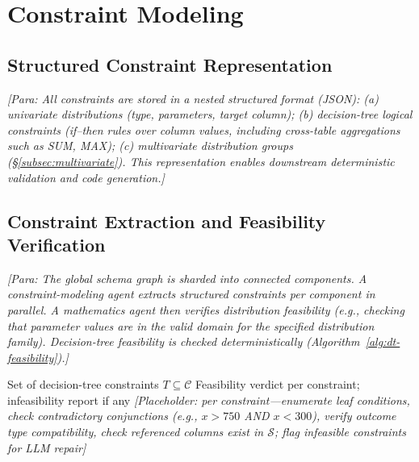 \section{Constraint Modeling}
\label{sec:stage3}

\subsection{Structured Constraint Representation}
\textit{[Para: All constraints are stored in a nested structured format (JSON):
(a) univariate distributions (type, parameters, target column);
(b) decision-tree logical constraints (if--then rules over column values, including
cross-table aggregations such as SUM, MAX);
(c) multivariate distribution groups (\S\ref{subsec:multivariate}).
This representation enables downstream deterministic validation and code generation.]}

\subsection{Constraint Extraction and Feasibility Verification}
\textit{[Para: The global schema graph is sharded into connected components.
A constraint-modeling agent extracts structured constraints per component in parallel.
A mathematics agent then verifies distribution feasibility (e.g., checking that parameter
values are in the valid domain for the specified distribution family).
Decision-tree feasibility is checked deterministically (Algorithm~\ref{alg:dt-feasibility}).]}

\begin{algorithm}[t]
\caption{Deterministic Decision-Tree Feasibility Check}
\label{alg:dt-feasibility}
\begin{algorithmic}[1]
  \Require Set of decision-tree constraints $T \subseteq \mathcal{C}$
  \Ensure Feasibility verdict per constraint; infeasibility report if any
  \State \textit{[Placeholder: per constraint---enumerate leaf conditions,
         check contradictory conjunctions (e.g., $x > 750$ AND $x < 300$),
         verify outcome type compatibility, check referenced columns exist in $\mathcal{S}$;
         flag infeasible constraints for LLM repair]}
\end{algorithmic}
\end{algorithm}

